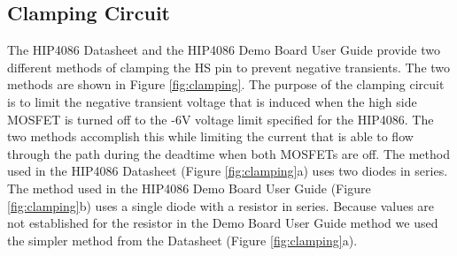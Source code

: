 \documentclass{article}
\begin{document}
\subsection{Clamping Circuit}
The HIP4086 Datasheet and the HIP4086 Demo Board User Guide provide two different methods of clamping the HS pin to prevent negative transients. The two methods are shown in Figure \ref{fig:clamping}. The purpose of the clamping circuit is to limit the negative transient voltage that is induced when the high side MOSFET is turned off to the -6V voltage limit specified for the HIP4086. The two methods accomplish this while limiting the current that is able to flow through the path during the deadtime when both MOSFETs are off. The method used in the HIP4086 Datasheet (Figure \ref{fig:clamping}a) uses two diodes in series.  The method used in the HIP4086 Demo Board User Guide (Figure \ref{fig:clamping}b) uses a single diode with a resistor in series. Because values are not established for the resistor in the Demo Board User Guide method we used the simpler method from the Datasheet (Figure \ref{fig:clamping}a).
\end{document}
